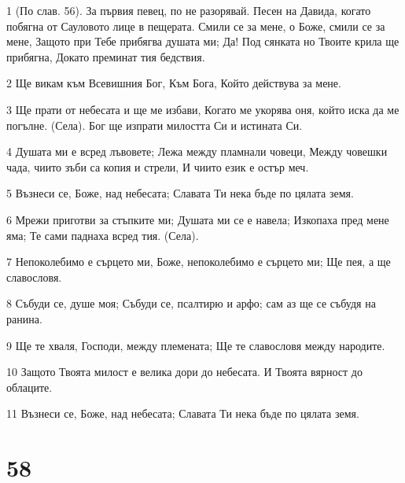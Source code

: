 \par 1 (По слав. 56). За първия певец, по не разорявай. Песен на Давида, когато побягна от Сауловото лице в пещерата. Смили се за мене, о Боже, смили се за мене, Защото при Тебе прибягва душата ми; Да! Под сянката но Твоите крила ще прибягна, Докато преминат тия бедствия.
\par 2 Ще викам към Всевишния Бог, Към Бога, Който действува за мене.
\par 3 Ще прати от небесата и ще ме избави, Когато ме укорява оня, който иска да ме погълне. (Села). Бог ще изпрати милостта Си и истината Си.
\par 4 Душата ми е всред лъвовете; Лежа между пламнали човеци, Между човешки чада, чиито зъби са копия и стрели, И чиито език е остър меч.
\par 5 Възнеси се, Боже, над небесата; Славата Ти нека бъде по цялата земя.
\par 6 Мрежи приготви за стъпките ми; Душата ми се е навела; Изкопаха пред мене яма; Те сами паднаха всред тия. (Села).
\par 7 Непоколебимо е сърцето ми, Боже, непоколебимо е сърцето ми; Ще пея, а ще славословя.
\par 8 Събуди се, душе моя; Събуди се, псалтирю и арфо; сам аз ще се събудя на ранина.
\par 9 Ще те хваля, Господи, между племената; Ще те славословя между народите.
\par 10 Защото Твоята милост е велика дори до небесата. И Твоята вярност до облаците.
\par 11 Възнеси се, Боже, над небесата; Славата Ти нека бъде по цялата земя.

\chapter{58}

